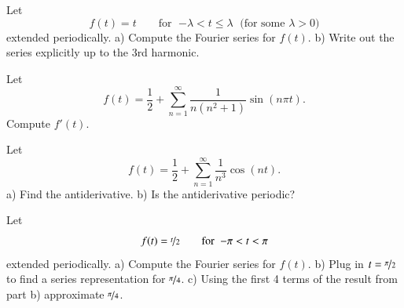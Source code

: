 \documentclass[12pt]{book}
\begin{document}
\begin{exercise}
Let
\begin{equation*}
f(t) = t \qquad \text{for } \; {-\lambda} < t \leq \lambda \; \text{ (for
some } \lambda > 0 \text{)}
\end{equation*}
extended periodically. a) Compute the Fourier series for $f(t)$. b) Write out the series explicitly up to
the 3rd harmonic.
\end{exercise}

\begin{exercise}
Let
\begin{equation*}
f(t) = \frac{1}{2} + \sum_{n=1}^\infty
\frac{1}{n(n^2+1)}
\sin(n\pi t) .
\end{equation*}
Compute $f'(t)$.
\end{exercise}

\begin{exercise}
Let
\begin{equation*}
f(t) = \frac{1}{2} + \sum_{n=1}^\infty
\frac{1}{n^3}
\cos(n t) .
\end{equation*}
a) Find the antiderivative.
b) Is the antiderivative periodic?
\end{exercise}

\begin{exercise}
Let
\begin{equation*}
f(t) = \nicefrac{t}{2} \qquad \text{for } \; {-\pi} < t < \pi
\end{equation*}
extended periodically.
a) Compute the Fourier series for $f(t)$.
b) Plug in $t=\nicefrac{\pi}{2}$ to find a series representation
for $\nicefrac{\pi}{4}$. c) Using the first 4 terms of the result from part b)
approximate $\nicefrac{\pi}{4}$.
\end{exercise}
\end{document}
